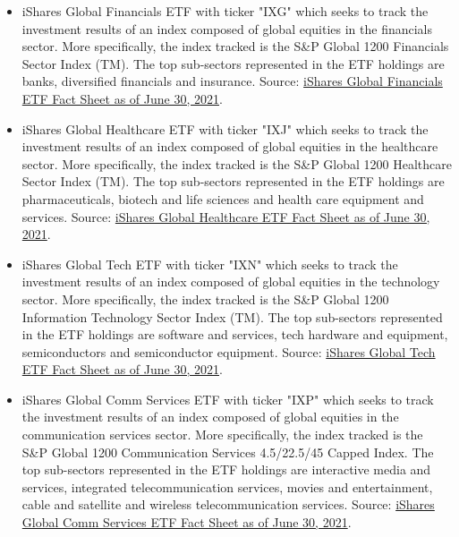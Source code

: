 \begin{itemize}
    \item iShares Global Financials ETF with ticker "IXG" which seeks to track the investment results of an index composed of global equities in the financials sector. More specifically, the index tracked is the S{\&}P Global 1200 Financials Sector Index (TM). The top sub-sectors represented in the ETF holdings are banks, diversified financials and insurance. Source: \href{https://www.ishares.com/us/literature/fact-sheet/ixg-ishares-global-financials-etf-fund-fact-sheet-en-us.pdf}{iShares Global Financials ETF Fact Sheet as of June 30, 2021}.%
    
    \item iShares Global Healthcare ETF with ticker "IXJ" which seeks to track the investment results of an index composed of global equities in the healthcare sector. More specifically, the index tracked is the S{\&}P Global 1200 Healthcare Sector Index (TM). The top sub-sectors represented in the ETF holdings are pharmaceuticals, biotech and life sciences and health care equipment and services. Source: \href{https://www.ishares.com/us/literature/fact-sheet/ixj-ishares-global-healthcare-etf-fund-fact-sheet-en-us.pdf}{iShares Global Healthcare ETF Fact Sheet as of June 30, 2021}.%
        
    \item iShares Global Tech ETF with ticker "IXN" which seeks to track the investment results of an index composed of global equities in the technology sector. More specifically, the index tracked is the S{\&}P Global 1200 Information Technology Sector Index (TM). The top sub-sectors represented in the ETF holdings are software and services, tech hardware and equipment, semiconductors and semiconductor equipment. Source: \href{https://www.ishares.com/us/literature/fact-sheet/ixn-ishares-global-tech-etf-fund-fact-sheet-en-us.pdf}{iShares Global Tech ETF Fact Sheet as of June 30, 2021}.%
    
    \item iShares Global Comm Services ETF with ticker "IXP" which seeks to track the investment results of an index composed of global equities in the communication services sector. More specifically, the index tracked is the S{\&}P Global 1200 Communication Services 4.5/22.5/45 Capped Index. The top sub-sectors represented in the ETF holdings are interactive media and services, integrated telecommunication services, movies and entertainment, cable and satellite and wireless telecommunication services. Source: \href{https://www.ishares.com/us/literature/fact-sheet/ixp-ishares-global-comm-services-etf-fund-fact-sheet-en-us.pdf}{iShares Global Comm Services ETF Fact Sheet as of June 30, 2021}.%
    

\end{itemize}
